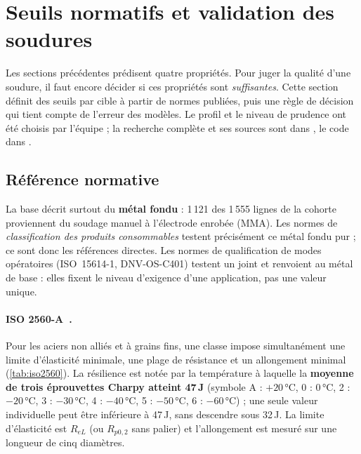 \clearpage
\section{Seuils normatifs et validation des soudures}
\label{sec:validation}

Les sections précédentes prédisent quatre propriétés. Pour juger la
\og qualité \fg{} d'une soudure, il faut encore décider si ces propriétés sont
\emph{suffisantes}. Cette section définit des seuils par cible à partir de
normes publiées, puis une règle de décision qui tient compte de l'erreur des
modèles. Le profil et le niveau de prudence ont été choisis par l'équipe ;
la recherche complète et ses sources sont dans
, le code dans
.

\subsection{Référence normative}

La base décrit surtout du \textbf{métal fondu} : 1\,121 des 1\,555 lignes de la
cohorte proviennent du soudage manuel à l'électrode enrobée (MMA). Les normes de
\emph{classification des produits consommables} testent précisément ce métal
fondu pur ; ce sont donc les références directes. Les normes de qualification de
modes opératoires (ISO~15614-1, DNV-OS-C401) testent un joint et renvoient au
métal de base : elles fixent le niveau d'exigence d'une application, pas une
valeur unique.

\paragraph{ISO 2560-A~\cite{iso_2560,twi_consumables}.} Pour les aciers non
alliés et à grains fins, une classe impose simultanément une limite d'élasticité
minimale, une plage de résistance et un allongement minimal
(\cref{tab:iso2560}). La résilience est notée par la température à laquelle la
\textbf{moyenne de trois éprouvettes Charpy atteint 47\,J} (symbole A : $+20$\,°C,
0 : 0\,°C, 2 : $-20$\,°C, 3 : $-30$\,°C, 4 : $-40$\,°C, 5 : $-50$\,°C,
6 : $-60$\,°C) ; une seule valeur individuelle peut être inférieure à 47\,J, sans
descendre sous 32\,J. La limite d'élasticité est $R_{eL}$ (ou $R_{p0,2}$ sans
palier) et l'allongement est mesuré sur une longueur de cinq diamètres.

